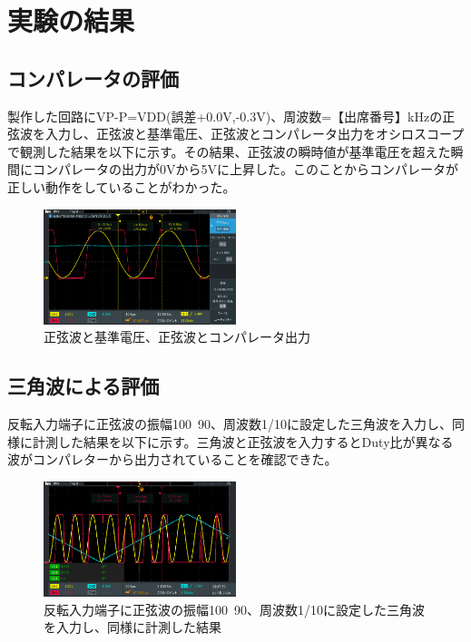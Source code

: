 \documentclass[a4paper,11pt,xelatex,ja=standard]{bxjsarticle}
\begin{document}
\section{実験の結果}
    \subsection{コンパレータの評価}

        製作した回路にVP-P=VDD(誤差+0.0V,-0.3V)、周波数=【出席番号】kHzの正弦波を入力し、正弦波と基準電圧、正弦波とコンパレータ出力をオシロスコープで観測した結果を以下に示す。その結果、正弦波の瞬時値が基準電圧を超えた瞬間にコンパレータの出力が0Vから5Vに上昇した。このことからコンパレータが正しい動作をしていることがわかった。

        \begin{figure}[H]
            \centering
            \includegraphics[width=0.5\textwidth]{./img/24-6-1/3.png}
            \caption{正弦波と基準電圧、正弦波とコンパレータ出力}
        \end{figure}

    \subsection{三角波による評価}
        反転入力端子に正弦波の振幅100~90、周波数1/10に設定した三角波を入力し、同様に計測した結果を以下に示す。三角波と正弦波を入力するとDuty比が異なる波がコンパレターから出力されていることを確認できた。

        \begin{figure}[H]
            \centering
            \includegraphics[width=0.5\textwidth]{./img/24-6-1/4.png}
            \caption{反転入力端子に正弦波の振幅100~90、周波数1/10に設定した三角波を入力し、同様に計測した結果}
        \end{figure}
\end{document}
